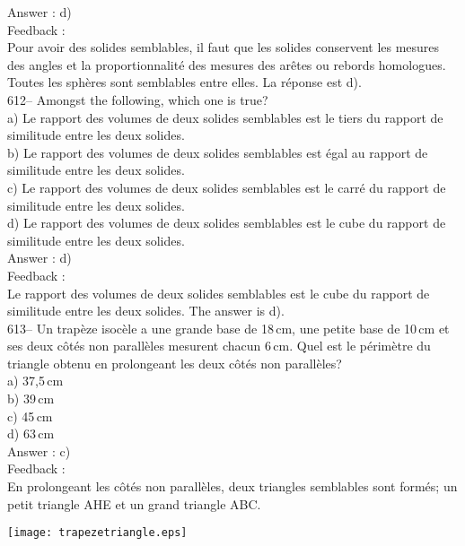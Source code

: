 ﻿\documentclass[letterpaper, 12pt]{article}
\begin{document}
Answer : d)\\

Feedback : \\
Pour avoir des solides semblables, il faut que les solides conservent les
mesures des angles et la proportionnalit\'e des mesures des ar\^etes ou
rebords homologues.  Toutes les sph\`eres sont semblables entre elles.  La
r\'eponse est d).\\


612-- Amongst the following, which one is true?\\
a) Le rapport des volumes de deux solides semblables est le tiers du rapport
de similitude entre les deux solides.\\
b) Le rapport des volumes de deux solides semblables est \'egal au rapport
de similitude entre les deux solides.\\
c) Le rapport des volumes de deux solides semblables est le carr\'e du
rapport de similitude entre les deux solides.\\
d) Le rapport des volumes de deux solides semblables est le cube du rapport
de similitude entre les deux solides.\\

Answer : d)\\

Feedback : \\
Le rapport des volumes de deux solides semblables est le cube du rapport de
similitude entre les deux solides.  The answer is d).\\

613-- Un trap\`eze isoc\`ele a une grande base de 18\,cm, une petite base de
10\,cm et ses deux c\^ot\'es non parall\`eles mesurent chacun 6\,cm.  Quel
est le p\'erim\`etre du triangle obtenu en prolongeant les deux c\^ot\'es
non parall\`eles?\\
a) 37,5\,cm\\
b) 39\,cm\\
c) 45\,cm\\
d) 63\,cm\\

Answer : c)\\

Feedback : \\
En prolongeant les c\^ot\'es non parall\`eles, deux triangles semblables
sont form\'es; un petit triangle AHE et un grand triangle ABC.\\
    \begin{center}
    \texttt{[image: trapezetriangle.eps]}
    \end{center}
\end{document}
